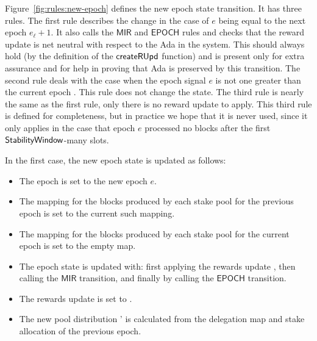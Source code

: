 Figure~\ref{fig:rules:new-epoch} defines the new epoch state transition. It has three rules.
The first rule describes the change in the case of $e$ being equal to the next epoch $e_\ell+ 1$.
It also calls the $\mathsf{MIR}$ and $\mathsf{EPOCH}$ rules and checks that the reward update
is net neutral with respect to the Ada in the system.
This should always hold (by the definition of the $\mathsf{createRUpd}$ function)
and is present only for extra assurance and for help in proving
that Ada is preserved by this transition.
The second rule deals with the case when the epoch signal $e$ is not one greater than the
current epoch . This rule does not change the state.
The third rule is nearly the same as the first rule, only there is no reward update to apply.
This third rule is defined for completeness, but in practice we hope that it is never used,
since it only applies in the case that epoch $e$ processed no blocks after the first
$\mathsf{StabilityWindow}$-many slots.

In the first case, the new epoch state is updated as follows:

\begin{itemize}
\item The epoch is set to the new epoch $e$.
\item The mapping for the blocks produced by each stake pool for the previous epoch
  is set to the current such mapping.
\item The mapping for the blocks produced by each stake pool for the current epoch
  is set to the empty map.
\item The epoch state is updated with: first applying the rewards update ,
  then calling the $\mathsf{MIR}$ transition, and finally by calling the
  $\mathsf{EPOCH}$ transition.
\item The rewards update is set to \Nothing.
\item The new pool distribution ' is calculated from the delegation map and
  stake allocation of the previous epoch.
\end{itemize}

